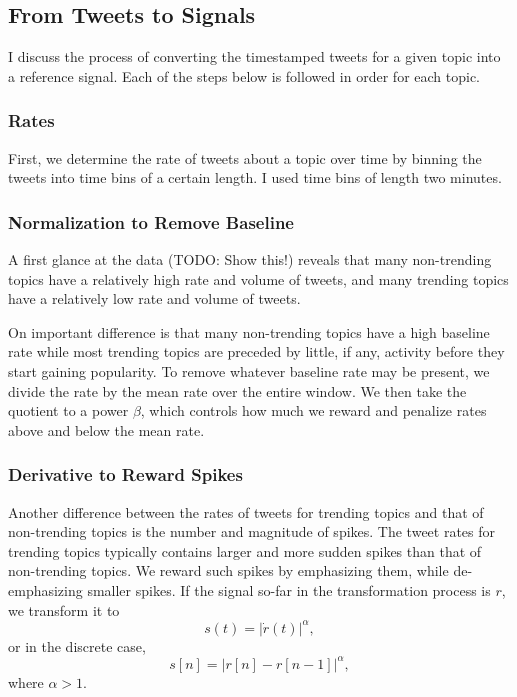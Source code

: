 
\subsection{From Tweets to Signals}
I discuss the process of converting the timestamped tweets for a given topic
into a reference signal. Each of the steps below is followed in order for each
topic.

\subsubsection{Rates}
First, we determine the rate of tweets about a topic over time by binning the
tweets into time bins of a certain length. I used time bins of length two
minutes. 

\subsubsection{Normalization to Remove Baseline}
A first glance at the data (TODO: Show this!) reveals that many non-trending
topics have a relatively high rate and volume of tweets, and many trending
topics have a relatively low rate and volume of tweets.

On important difference is that many non-trending topics have a high baseline
rate while most trending topics are preceded by little, if any, activity before
they start gaining popularity. To remove whatever baseline rate may be present,
we divide the rate by the mean rate over the entire window. We then take the
quotient to a power $\beta$, which controls how much we reward and penalize
rates above and below the mean rate.

\subsubsection{Derivative to Reward Spikes}
Another difference between the rates of tweets for trending topics and that of
non-trending topics is the number and magnitude of spikes. The tweet rates for
trending topics typically contains larger and more sudden spikes than that of
non-trending topics. We reward such spikes by emphasizing them, while
de-emphasizing smaller spikes. If the signal so-far in the transformation
process is $r$, we transform it to \[ s(t) = |\dot{r}(t)|^{\alpha},\] or in the
discrete case, \[ s[n] = |r[n] - r[n-1]|^{\alpha},\] where $\alpha > 1$.

